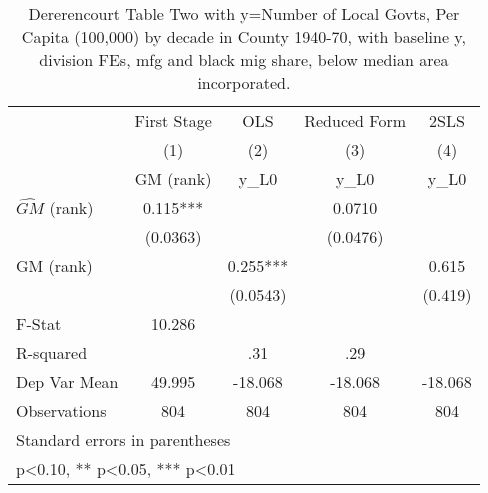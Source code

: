 \begin{table}[htbp]\centering
\def\sym#1{\ifmmode^{#1}\else\(^{#1}\)\fi}
\caption{Dererencourt Table Two with y=Number of Local Govts, Per Capita (100,000) by decade in County 1940-70, with baseline y, division FEs, mfg and black mig share, below median area incorporated.}
\begin{tabular}{l*{4}{c}}
\toprule
                    & First Stage   &         OLS   &Reduced Form   &        2SLS   \\
                    &\multicolumn{1}{c}{(1)}&\multicolumn{1}{c}{(2)}&\multicolumn{1}{c}{(3)}&\multicolumn{1}{c}{(4)}\\
                    &\multicolumn{1}{c}{GM  (rank)}&\multicolumn{1}{c}{y\_L0}&\multicolumn{1}{c}{y\_L0}&\multicolumn{1}{c}{y\_L0}\\
\midrule
$\hat{GM}$ (rank)   &       0.115***&               &      0.0710   &               \\
                    &    (0.0363)   &               &    (0.0476)   &               \\
\addlinespace
GM  (rank)          &               &       0.255***&               &       0.615   \\
                    &               &    (0.0543)   &               &     (0.419)   \\
\midrule
F-Stat              &      10.286   &               &               &               \\
R-squared           &               &         .31   &         .29   &               \\
Dep Var Mean        &      49.995   &     -18.068   &     -18.068   &     -18.068   \\
Observations        &         804   &         804   &         804   &         804   \\
\bottomrule
\multicolumn{5}{l}{\footnotesize Standard errors in parentheses}\\
\multicolumn{5}{l}{\footnotesize * p<0.10, ** p<0.05, *** p<0.01}\\
\end{tabular}
\end{table}
